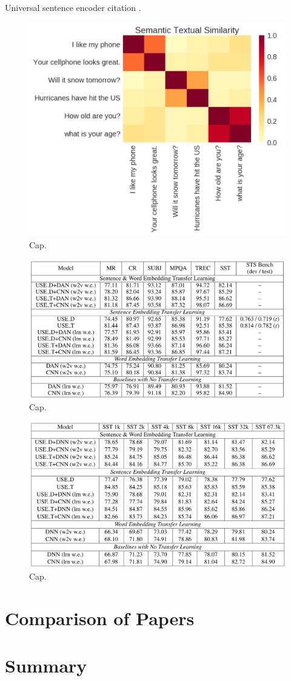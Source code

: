 Universal sentence encoder citation \cite{use}.

\begin{figure}
\centering
  \includegraphics[width=.5\linewidth]{files/use-1.png}
  \caption{Cap.}
  \label{fig:vae}
\end{figure}

\begin{figure}
\centering
  \includegraphics[width=.5\linewidth]{files/use-2.png}
  \caption{Cap.}
  \label{fig:vae}
\end{figure}

\begin{figure}
\centering
  \includegraphics[width=.5\linewidth]{files/use-3.png}
  \caption{Cap.}
  \label{fig:vae}
\end{figure}

\section{\label{sec:level5} Comparison of Papers}

\section{\label{sec:level6} Summary}
